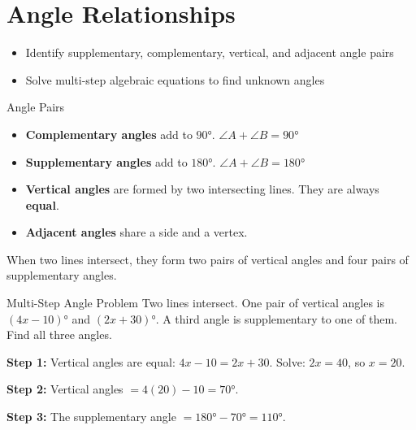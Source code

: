 \section{Angle Relationships}

\begin{learningGoals}
\begin{itemize}
    \item Identify supplementary, complementary, vertical, and adjacent angle pairs
    \item Solve multi-step algebraic equations to find unknown angles
\end{itemize}
\end{learningGoals}

\begin{conceptBox}{Angle Pairs}
\begin{itemize}[leftmargin=*]
    \item \textbf{Complementary angles} add to $90°$. \quad $\angle A + \angle B = 90°$
    \item \textbf{Supplementary angles} add to $180°$. \quad $\angle A + \angle B = 180°$
    \item \textbf{Vertical angles} are formed by two intersecting lines. They are always \textbf{equal}.
    \item \textbf{Adjacent angles} share a side and a vertex.
\end{itemize}
When two lines intersect, they form two pairs of vertical angles and four pairs of supplementary angles.
\end{conceptBox}

\begin{workedExample}{Multi-Step Angle Problem}
Two lines intersect. One pair of vertical angles is $(4x - 10)°$ and $(2x + 30)°$. A third angle is supplementary to one of them. Find all three angles.

\textbf{Step 1:} Vertical angles are equal: $4x - 10 = 2x + 30$. Solve: $2x = 40$, so $x = 20$.

\textbf{Step 2:} Vertical angles $= 4(20) - 10 = 70°$.

\textbf{Step 3:} The supplementary angle $= 180° - 70° = 110°$.
\end{workedExample}



